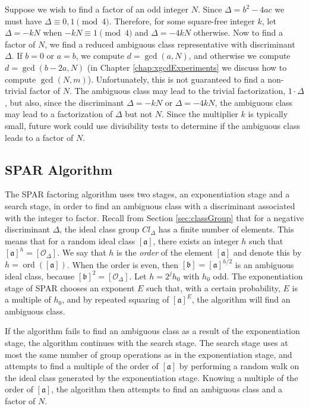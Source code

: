 \documentclass{ucalgthes1}
\theoremstyle{definition}
\DeclareMathOperator{\ord}{ord}
\newcommand{\ideal}{\mathfrak}
\newcommand{\idealclass}[1]{\left[ \ideal #1 \right]}
\newcommand{\aclass}{\idealclass a}
\newcommand{\bclass}{\idealclass b}
\newcommand{\idclass}{[\mathcal O_\Delta]}
\begin{document}
Suppose we wish to find a factor of an odd integer $N$.  Since $\Delta = b^2 - 4ac$ we must have $\Delta \equiv 0, 1 \pmod 4$.  Therefore, for some square-free integer $k$, let $\Delta = -kN$ when $-kN \equiv 1 \pmod 4$ and $\Delta = -4kN$ otherwise.  Now to find a factor of $N$, we find a reduced ambiguous class representative with discriminant $\Delta$.  If $b = 0$ or $a = b$, we compute $d = \gcd(a, N)$, and otherwise we compute $d = \gcd(b-2a, N)$ (in Chapter \ref{chap:xgcdExperiments} we discuss how to compute $\gcd(N, m)$).  Unfortunately, this is not guaranteed to find a non-trivial factor of $N$.  The ambiguous class may lead to the trivial factorization, $1 \cdot \Delta$, but also, since the discriminant $\Delta = -kN$ or $\Delta = -4kN$, the ambiguous class may lead to a factorization of $\Delta$ but not $N$.  Since the multiplier $k$ is typically small, future work could use divisibility tests to determine if the ambiguous class leads to a factor of $N$.


\subsection{SPAR Algorithm}
\label{subsec:sparAlg}

The SPAR factoring algorithm uses two stages, an exponentiation stage and a search stage, in order to find an ambiguous class with a discriminant associated with the integer to factor.  Recall from Section \ref{sec:classGroup} that for a negative discriminant $\Delta$, the ideal class group $Cl_\Delta$ has a finite number of elements.  This means that for a random ideal class $\aclass$, there exists an integer $h$ such that $\aclass^h = \idclass$. We say that $h$ is the \emph{order} of the element $\aclass$ and denote this by $h = \ord(\aclass)$.  When the order is even, then $\bclass = \aclass^{h/2}$ is an ambiguous ideal class, because $\bclass^2 = \idclass$.  Let $h = 2^j h_0$ with $h_0$ odd.  The exponentiation stage of SPAR chooses an exponent $E$ such that, with a certain probability, $E$ is a multiple of $h_0$, and by repeated squaring of $\aclass^E$, the algorithm will find an ambiguous class.

If the algorithm fails to find an ambiguous class as a result of the exponentiation stage, the algorithm continues with the search stage.  The search stage uses at most the same number of group operations as in the exponentiation stage, and attempts to find a multiple of the order of $\aclass$ by performing a random walk on the ideal class generated by the exponentiation stage.  Knowing a multiple of the order of $\aclass$, the algorithm then attempts to find an ambiguous class and a factor of $N$.
\end{document}
